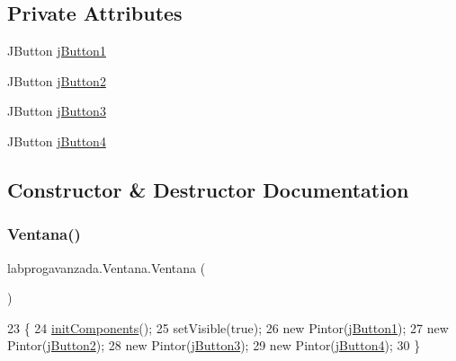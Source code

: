 \subsection*{Private Attributes}
\begin{DoxyCompactItemize}
\item 
J\+Button \mbox{\hyperlink{classlabprogavanzada_1_1_ventana_aaefd42529d112e472936e52efb94ae50}{j\+Button1}}
\item 
J\+Button \mbox{\hyperlink{classlabprogavanzada_1_1_ventana_a33d2405f9bf4b2f5b095e92ad78de78d}{j\+Button2}}
\item 
J\+Button \mbox{\hyperlink{classlabprogavanzada_1_1_ventana_af4bec17d2ee089325b41954139e9979b}{j\+Button3}}
\item 
J\+Button \mbox{\hyperlink{classlabprogavanzada_1_1_ventana_a0eb30c9986200f02ee0e17f4c8bcecd1}{j\+Button4}}
\end{DoxyCompactItemize}


\subsection{Constructor \& Destructor Documentation}
\mbox{\label{classlabprogavanzada_1_1_ventana_a319001fd51267e1ec98672374cb2b2ca}} 
\subsubsection{\texorpdfstring{Ventana()}{Ventana()}}
{\footnotesize\ttfamily labprogavanzada.\+Ventana.\+Ventana (\begin{DoxyParamCaption}{ }\end{DoxyParamCaption})\hspace{0.3cm}{\ttfamily [inline]}}


\begin{DoxyCode}
23                      \{
24         \mbox{\hyperlink{classlabprogavanzada_1_1_ventana_aa8e6a326cba22bfe2a249dc70d21848b}{initComponents}}();
25         setVisible(\textcolor{keyword}{true});
26         \textcolor{keyword}{new} Pintor(\mbox{\hyperlink{classlabprogavanzada_1_1_ventana_aaefd42529d112e472936e52efb94ae50}{jButton1}});
27         \textcolor{keyword}{new} Pintor(\mbox{\hyperlink{classlabprogavanzada_1_1_ventana_a33d2405f9bf4b2f5b095e92ad78de78d}{jButton2}});
28         \textcolor{keyword}{new} Pintor(\mbox{\hyperlink{classlabprogavanzada_1_1_ventana_af4bec17d2ee089325b41954139e9979b}{jButton3}});
29         \textcolor{keyword}{new} Pintor(\mbox{\hyperlink{classlabprogavanzada_1_1_ventana_a0eb30c9986200f02ee0e17f4c8bcecd1}{jButton4}});
30     \}
\end{DoxyCode}


